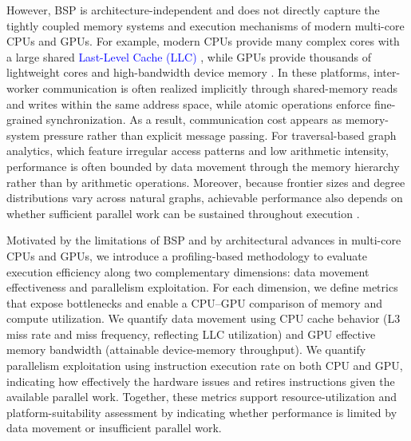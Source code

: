 However, BSP is architecture-independent and does not directly capture the tightly coupled memory systems and execution mechanisms of modern multi-core CPUs and GPUs.
For example, modern CPUs provide many complex cores with a large shared \label{para:first-llc}\textcolor{blue}{Last-Level Cache (LLC)} \cite{cpu_arch_amd}, while GPUs provide thousands of lightweight cores and high-bandwidth device memory \cite{nvidia_ampere_architecture_whitepaper}.
In these platforms, inter-worker communication is often realized implicitly through shared-memory reads and writes within the same address space, while atomic operations enforce fine-grained synchronization.
As a result, communication cost appears as memory-system pressure rather than explicit message passing.
For traversal-based graph analytics, which feature irregular access patterns and low arithmetic intensity, performance is often bounded by data movement through the memory hierarchy rather than by arithmetic operations.
Moreover, because frontier sizes and degree distributions vary across natural graphs, achievable performance also depends on whether sufficient parallel work can be sustained throughout execution \cite{gonzalez2012powergraph}.

Motivated by the limitations of BSP and by architectural advances in multi-core CPUs and GPUs, we introduce a profiling-based methodology to evaluate execution efficiency along two complementary dimensions: data movement effectiveness and parallelism exploitation. For each dimension, we define metrics that expose bottlenecks and enable a CPU--GPU comparison of memory and compute utilization. We quantify data movement using CPU cache behavior (L3 miss rate and miss frequency, reflecting LLC utilization) and GPU effective memory bandwidth (attainable device-memory throughput). We quantify parallelism exploitation using instruction execution rate on both CPU and GPU, indicating how effectively the hardware issues and retires instructions given the available parallel work. Together, these metrics support resource-utilization and platform-suitability assessment by indicating whether performance is limited by data movement or insufficient parallel work.

